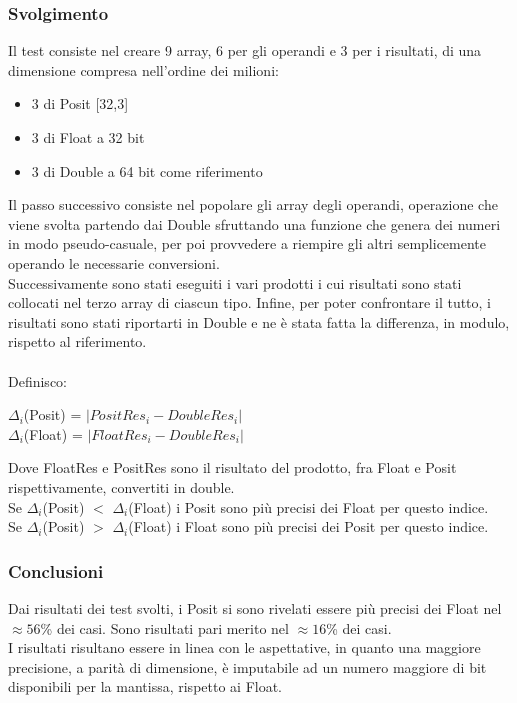 \documentclass[a4paper,11pt]{article}
\begin{document}
\subsubsection{Svolgimento}
Il test consiste nel creare 9 array, 6 per gli operandi e 3 per i risultati, di una dimensione compresa nell'ordine dei milioni: \begin{itemize}
	\item 3 di Posit [32,3]
	\item 3 di Float a 32 bit 
	\item 3 di Double a 64 bit come riferimento
\end{itemize} Il passo successivo consiste nel popolare gli array degli operandi, operazione che viene svolta partendo dai Double sfruttando una funzione che genera dei numeri in modo pseudo-casuale, per poi provvedere a riempire gli altri semplicemente operando le necessarie conversioni.\\
Successivamente sono stati eseguiti i vari prodotti i cui risultati sono stati collocati nel terzo array di ciascun tipo. Infine, per poter confrontare il tutto, i risultati sono stati riportarti in Double e ne è stata fatta la differenza, in modulo, rispetto al riferimento.\\\\ Definisco: \begin{center}  $\Delta_i$(Posit) = $|PositRes_i - DoubleRes_i|$  \\ $\Delta_i$(Float)  = $|FloatRes_i - DoubleRes_i|$ \end{center} 
Dove FloatRes e PositRes sono il risultato del prodotto, fra Float e Posit rispettivamente, convertiti in double. \\Se $\Delta_i$(Posit) $<$ $\Delta_i$(Float) i Posit sono più precisi dei Float per questo indice.\\ Se $\Delta_i$(Posit) $>$ $\Delta_i$(Float) i Float sono più precisi dei Posit per questo indice.

\subsubsection{Conclusioni}
Dai risultati dei test svolti, i Posit si sono rivelati essere più precisi dei Float nel $\approx56$\% dei casi. Sono risultati pari merito nel $\approx16$\% dei casi.\\
I risultati risultano essere in linea con le aspettative, in quanto una maggiore precisione, a parità di dimensione, è imputabile ad un numero maggiore di bit disponibili per la mantissa, rispetto ai Float. 
\end{document}
